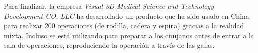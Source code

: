 Para finalizar, la empresa \textit{Visual 3D Medical Science and Technology Development CO. LLC} ha desarrollado un producto que ha sido usado en China para realizar 200 operaciones (de rodilla, cadera y espina) gracias a la realidad mixta. Incluso se está utilizando para preparar a los cirujanos antes de entrar a la sala de operaciones, reproduciendo la operación a través de las gafas. 






